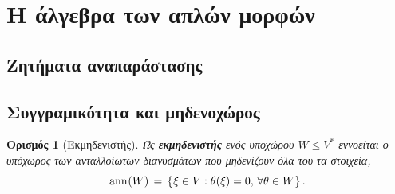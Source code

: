 \documentclass[11pt,a4paper,twoside,openright]{book}
\newtheorem{definition}[lemma]{Ορισμός}
\begin{document}
\section{Η άλγεβρα των απλών μορφών}

\subsection{Ζητήματα αναπαράστασης}

\subsection{Συγγραμικότητα και μηδενοχώρος}

\begin{definition}[Εκμηδενιστής]
	\label{def:annihilator}
Ώς \textbf{εκμηδενιστής} ενός υποχώρου $W \le V^*$ εννοείται ο
υπόχωρος των ανταλλοίωτων διανυσμάτων που μηδενίζουν όλα του τα στοιχεία,
\begin{equation}\label{eq:annihilator-covariant}
\operatorname{ann}\hspace{.5pt}(W)
\,=\,
\{\hspace{.5pt}\xi \in V: \theta(\xi) = 0,\, \forall \theta \in W\hspace{.25pt}\}\,.
\end{equation}
\end{definition}
\end{document}
